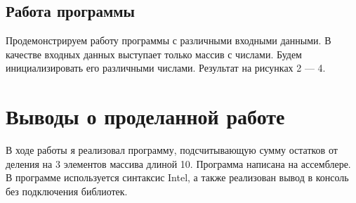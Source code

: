 \clearpage





\subsection{Работа программы}
Продемонстрируем работу программы с различными входными данными. В качестве входных данных выступает только массив с числами. Будем инициализировать его различными числами. Результат на рисунках 2 — 4.



\FloatBarrier

\FloatBarrier

\FloatBarrier



\clearpage



\section{Выводы о проделанной работе}
В ходе работы я реализовал программу, подсчитывающую сумму остатков от деления на 3 элементов массива длиной 10. Программа написана на ассемблере. В программе используется синтаксис Intel, а также реализован вывод в консоль без подключения библиотек.